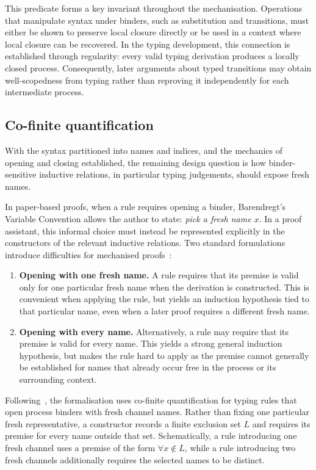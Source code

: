 This predicate forms a key invariant throughout the mechanisation. Operations that manipulate syntax under binders, such as substitution and transitions, must either be shown to preserve local closure directly or be used in a context where local closure can be recovered. In the typing development, this connection is established through regularity: every valid typing derivation produces a locally closed process. Consequently, later arguments about typed transitions may obtain well-scopedness from typing rather than reproving it independently for each intermediate process.

\subsection{Co-finite quantification}\label{subsec:co-finite-quantification} %
With the syntax partitioned into names and indices, and the mechanics of opening and closing established, the remaining design question is how binder-sensitive inductive relations, in particular typing judgements, should expose fresh names.

In paper-based proofs, when a rule requires opening a binder, Barendregt's Variable Convention allows the author to state: \emph{pick a fresh name $x$}. In a proof assistant, this informal choice must instead be represented explicitly in the constructors of the relevant inductive relations. Two standard formulations introduce difficulties for mechanised proofs~\citep{A08,C12}:

\begin{enumerate}
\item \textbf{Opening with one fresh name.} A rule requires that its premise is valid only for one particular fresh name when the derivation is constructed. This is convenient when applying the rule, but yields an induction hypothesis tied to that particular name, even when a later proof requires a different fresh name.
\item \textbf{Opening with every name.} Alternatively, a rule may require that its premise is valid for every name. This yields a strong general induction hypothesis, but makes the rule hard to apply as the premise cannot generally be established for names that already occur free in the process or its surrounding context.
\end{enumerate}

Following~\citet{C12,A08}, the formalisation uses co-finite quantification for typing rules that open process binders with fresh channel names. Rather than fixing one particular fresh representative, a constructor records a finite exclusion set $L$ and requires its premise for every name outside that set. Schematically, a rule introducing one fresh channel uses a premise of the form $\forall x \notin L$, while a rule introducing two fresh channels additionally requires the selected names to be distinct.


